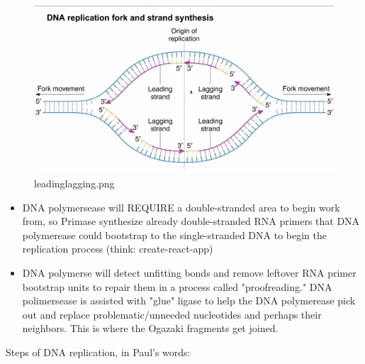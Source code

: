 \documentclass[letterpaper]{article}
\begin{document}
\begin{figure}[htbp]
\centering
\includegraphics[width=.9\linewidth]{leadinglagging.png}
\caption{leadinglagging.png}
\end{figure}

\begin{itemize}
\item DNA polymersease will REQUIRE a double-stranded area to begin work
from, so Primase synthesize already double-stranded RNA primers that
DNA polymerease could bootstrap to the single-stranded DNA to begin
the replication process (think: create-react-app)

\item DNA polymerse will detect unfitting bonds and remove leftover RNA
primer bootstrap units to repair them in a process called
"proofreading." DNA polimersease is assisted with "glue" ligase to
help the DNA polymerease pick out and replace problematic/unneeded
nucleotides and perhaps their neighbors. This is where the Ogazaki
fragments get joined.
\end{itemize}

Steps of DNA replication, in Paul's words:
\end{document}
